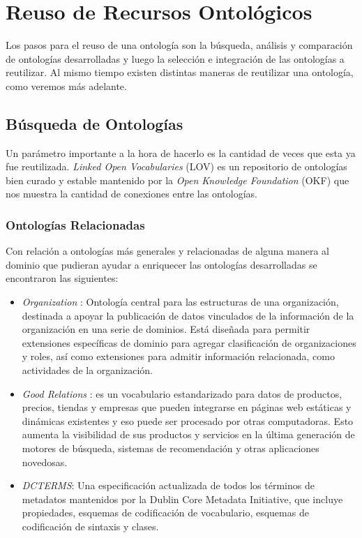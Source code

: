 
\section{Reuso de Recursos Ontológicos}
Los pasos para el reuso de una ontología son la búsqueda, análisis y comparación de ontologías desarrolladas y luego la selección e integración de las ontologías a reutilizar. Al mismo tiempo existen distintas maneras de reutilizar una ontología, como veremos más adelante. 

\subsection{Búsqueda de Ontologías}

Un parámetro importante a la hora de hacerlo es la cantidad de veces que esta ya fue reutilizada. \textit{Linked Open Vocabularies } (LOV) es un repositorio de ontologías bien curado y estable mantenido por la \textit{Open Knowledge Foundation}  (OKF) que nos muestra la cantidad de conexiones entre las ontologías.

\subsubsection{Ontologías Relacionadas}

Con relación a ontologías más generales y relacionadas de alguna manera al dominio que pudieran ayudar a enriquecer las ontologías desarrolladas se encontraron las siguientes:
\begin{itemize}
    \item \textit{Organization} : Ontología central para las estructuras de una organización, destinada a apoyar la publicación de datos vinculados de la información de la organización en una serie de dominios. Está diseñada para permitir extensiones específicas de dominio para agregar clasificación de organizaciones y roles, así como extensiones para admitir información relacionada, como actividades de la organización.
    \item \textit{Good Relations} : es un vocabulario estandarizado para datos de productos, precios, tiendas y empresas que pueden integrarse en páginas web estáticas y dinámicas existentes y eso puede ser procesado por otras computadoras. Esto aumenta la visibilidad de sus productos y servicios en la última generación de motores de búsqueda, sistemas de recomendación y otras aplicaciones novedosas.
    \item \textit{DCTERMS}: Una especificación actualizada de todos los términos de metadatos mantenidos por la Dublin Core Metadata Initiative, que incluye propiedades, esquemas de codificación de vocabulario, esquemas de codificación de sintaxis y clases. 
\end{itemize}

